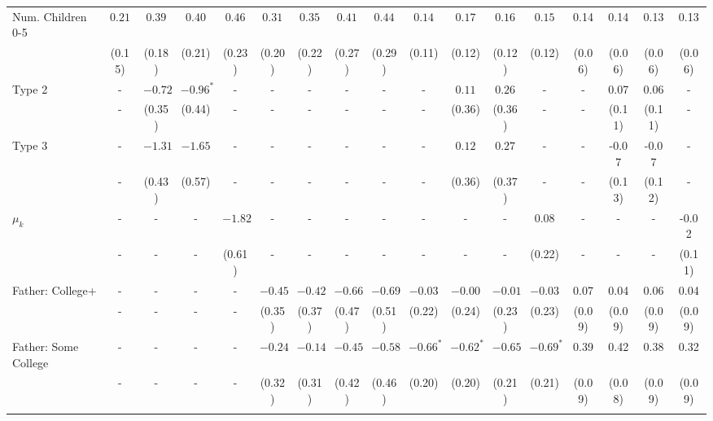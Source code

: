 \begin{tabular}{lcccccccccccccccc}
Num. Children 0-5&$0.21$&$0.39$&$0.40$&$0.46$&$0.31$&$0.35$&$0.41$&$0.44$&$0.14$&$0.17$&$0.16$&$0.15$&0.14&0.14&0.13&0.13\\
&(0.15)&(0.18)&(0.21)&(0.23)&(0.20)&(0.22)&(0.27)&(0.29)&(0.11)&(0.12)&(0.12)&(0.12)&(0.06)&(0.06)&(0.06)&(0.06)\\
Type 2&-&$-0.72$&$-0.96^{*}$&-&-&-&-&-&-&$0.11$&$0.26$&-&-&0.07&0.06&-\\
&-&(0.35)&(0.44)&-&-&-&-&-&-&(0.36)&(0.36)&-&-&(0.11)&(0.11)&-\\
Type 3&-&$-1.31$&$-1.65$&-&-&-&-&-&-&$0.12$&$0.27$&-&-&-0.07&-0.07&-\\
&-&(0.43)&(0.57)&-&-&-&-&-&-&(0.36)&(0.37)&-&-&(0.13)&(0.12)&-\\
$\mu_{k}$&-&-&-&$-1.82$&-&-&-&-&-&-&-&$0.08$&-&-&-&-0.02\\
&-&-&-&(0.61)&-&-&-&-&-&-&-&(0.22)&-&-&-&(0.11)\\
Father: College+&-&-&-&-&$-0.45$&$-0.42$&$-0.66$&$-0.69$&$-0.03$&$-0.00$&$-0.01$&$-0.03$&0.07&0.04&0.06&0.04\\
&-&-&-&-&(0.35)&(0.37)&(0.47)&(0.51)&(0.22)&(0.24)&(0.23)&(0.23)&(0.09)&(0.09)&(0.09)&(0.09)\\
Father: Some College&-&-&-&-&$-0.24$&$-0.14$&$-0.45$&$-0.58$&$-0.66^{*}$&$-0.62^{*}$&$-0.65$&$-0.69^{*}$&0.39&0.42&0.38&0.32\\
&-&-&-&-&(0.32)&(0.31)&(0.42)&(0.46)&(0.20)&(0.20)&(0.21)&(0.21)&(0.09)&(0.08)&(0.09)&(0.09)\\
\\
\bottomrule\end{tabular}